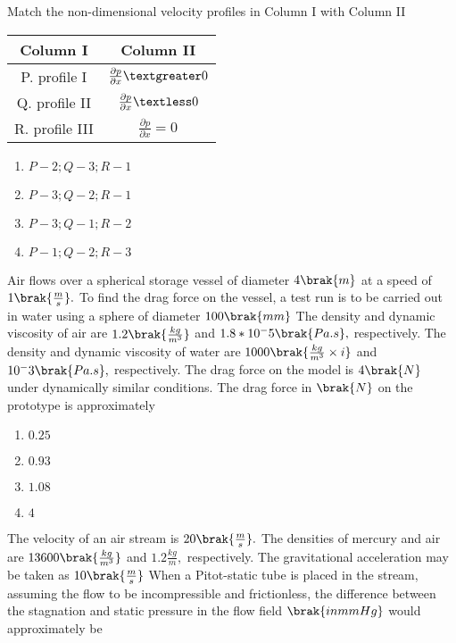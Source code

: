 Match the non-dimensional velocity profiles in Column I with Column II
\begin{table}[h]
    \centering
    \begin{tabular}{|c|c|} %
        \hline
        \textbf{Column I} & \textbf{Column II} \\ %
        \hline
        P. profile I & $\frac{\partial p}{\partial x}\textgreater 0$\\
        \hline
        Q. profile II & $\frac{\partial p}{\partial x}\textless 0$\\
        \hline
        R. profile III & $\frac{\partial p}{\partial x}= 0$\\
        \hline
        
    \end{tabular}
\end{table}
\begin{enumerate}
    \item $P-2;Q-3;R-1$
    \item $P-3;Q-2;R-1$
    \item $P-3;Q-1;R-2$
    \item $P-1;Q-2;R-3$
\end{enumerate}
\item Air flows over a spherical storage vessel of diameter $4 \brak{m}$ at a speed of $1 \brak{\frac{m}{s}}.$ To find the drag force on the vessel, a test run is to be carried out in water using a sphere of diameter $100 \brak{mm}$ The density and dynamic viscosity of air are $1.2\brak{\frac{kg}{ m ^ 3}}$ and $1.8 * 10 ^ - 5 \brak{Pa.s},$ respectively. The density and dynamic viscosity of water are $1000\brak{\frac{kg}{m^3}\times i}$ and $10 ^ - 3 \brak{Pa.s},$ respectively. The drag force on the model is $4 \brak{N}$ under dynamically similar conditions. The drag force in $\brak{N}$ on the prototype is approximately
\begin{enumerate}
    \item $0.25$
    \item $0.93$
    \item $1.08$
    \item $4$
\end{enumerate}
\item The velocity of an air stream is $20 \brak{\frac{m}{s}}.$ The densities of mercury and air are $13600 \brak{\frac{kg}{m^3}}$ and $1.2\frac{kg}{m},$ respectively. The gravitational acceleration may be taken as $10 \brak{\frac{m}{s}}$ When a Pitot-static tube is placed in the stream, assuming the flow to be incompressible and frictionless, the difference between the stagnation and static pressure in the flow field $\brak{in mm Hg}$ would approximately be
